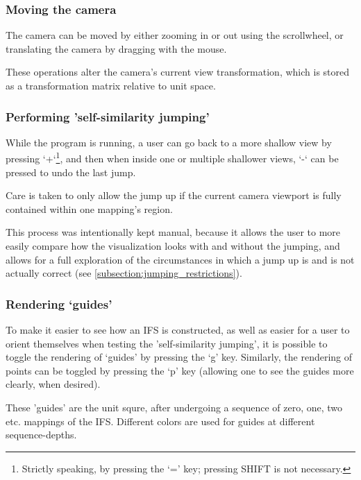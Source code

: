 \documentclass[11pt]{article}
\begin{document}
\subsubsection{Moving the camera}
\label{sec:org9b86566}
The camera can be moved by either zooming in or out using the scrollwheel,
or translating the camera by dragging with the mouse.

These operations alter the camera's current view transformation, 
which is stored as a transformation matrix relative to unit space.

\subsubsection{Performing 'self-similarity jumping'}
\label{sec:orgeacf60c}

While the program is running, a user can go back to a more shallow view by pressing `+`\footnote{Strictly speaking, by pressing the `=' key; pressing SHIFT is not necessary.}, and then when inside one or multiple shallower views,
`-` can be pressed to undo the last jump.

Care is taken to only allow the jump up if the current camera viewport is fully contained within one mapping's region.

This process was intentionally kept manual, because it allows the user to more easily compare how
the visualization looks with and without the jumping, and allows for a full exploration of the circumstances
in which a jump up is and is not actually correct (see \autoref{subsection:jumping_restrictions}).
\subsubsection{Rendering `guides'}
\label{sec:orgb605ae7}

To make it easier to see how an IFS is constructed, as well as easier for a user to orient themselves when
testing the 'self-similarity jumping', it is possible to toggle the rendering of `guides' by pressing the `g' key.
Similarly, the rendering of points can be toggled by pressing the `p' key (allowing one to see the guides more clearly, when desired).

These 'guides' are the unit squre, after undergoing a sequence of zero, one, two etc. mappings of the IFS.
Different colors are used for guides at different sequence-depths.
\end{document}
